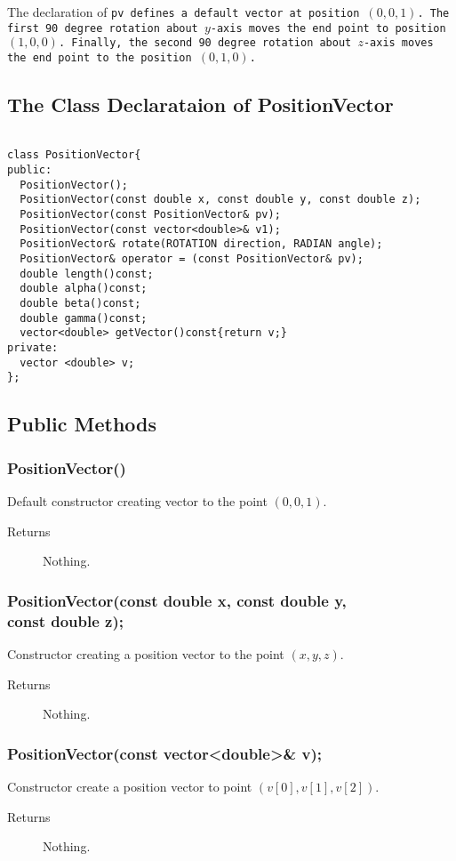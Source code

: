 The declaration of \tt pv \rm defines a default vector at position $(0,0,1)$.
The first 90 degree rotation about $y$-axis moves the end point to position 
$(1,0,0)$. Finally, the second 90 degree rotation about $z$-axis 
moves the end point to the position $(0,1,0)$.
 
\subsection{The Class Declarataion of PositionVector}
\begin{verbatim}
 
class PositionVector{
public:
  PositionVector();
  PositionVector(const double x, const double y, const double z);
  PositionVector(const PositionVector& pv);
  PositionVector(const vector<double>& v1);
  PositionVector& rotate(ROTATION direction, RADIAN angle);
  PositionVector& operator = (const PositionVector& pv);
  double length()const;
  double alpha()const;
  double beta()const;
  double gamma()const;
  vector<double> getVector()const{return v;}
private:
  vector <double> v;
};
\end{verbatim}

\subsection{Public Methods}
\subsubsection{PositionVector()}
Default constructor creating vector to the point $(0,0,1)$. 
    \begin{description}
       \item [Returns] Nothing.
    \end{description} 

\subsubsection{PositionVector(const double x, const double y,\\ 
const double z);}
Constructor creating a position vector to the point $(x,y,z)$. 
    \begin{description}
       \item [Returns] Nothing.
    \end{description} 

\subsubsection{PositionVector(const vector<double>\& v);} 
Constructor create a position vector to point $(v[0],v[1],v [2])$. 
    \begin{description}
       \item [Returns] Nothing.
    \end{description} 

